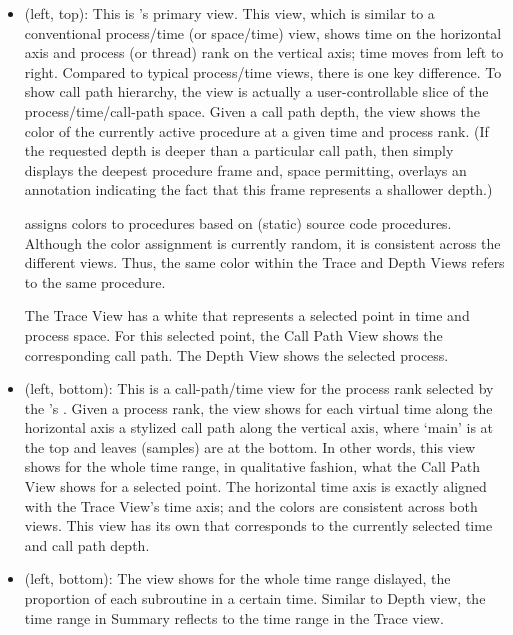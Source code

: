 \begin{itemize}
\item \textbf{\traceview} (left, top):
  This is \hpctraceviewer{}'s primary view.
  This view, which is similar to a conventional process/time (or space/time) view, shows time on the horizontal axis and process (or thread) rank on the vertical axis; time moves from left to right.
  Compared to typical process/time views, there is one key difference.
  To show call path hierarchy, the view is actually a user-controllable slice of the process/time/call-path space.
  Given a call path depth, the view shows the color of the currently active procedure at a given time and process rank.
  (If the requested depth is deeper than a particular call path, then \hpctraceviewer{} simply displays the deepest procedure frame and, space permitting, overlays an annotation indicating the fact that this frame represents a shallower depth.)

  \hpctraceviewer{} assigns colors to procedures based on (static) source code procedures.
  Although the color assignment is currently random, it is consistent across the different views.
  Thus, the same color within the Trace and Depth Views refers to the same procedure.

  The Trace View has a white \crosshair{} that represents a selected point in time and process space.
  For this selected point, the Call Path View shows the corresponding call path.
  The Depth View shows the selected process.

\item \textbf{\depthview} (left, bottom):
  This is a call-path/time view for the process rank selected by the \traceview's \crosshair{}.
  Given a process rank, the view shows for each virtual time along the horizontal axis a stylized call path along the vertical axis, where `main' is at the top and leaves (samples) are at the bottom.
  In other words, this view shows for the whole time range, in qualitative fashion, what the Call Path View shows for a selected point.
  The horizontal time axis is exactly aligned with the Trace View's time axis; and the colors are consistent across both views.
  This view has its own \crosshair{} that corresponds to the currently selected time and call path depth.

\item \textbf{\summaryview} (left, bottom):
  The view shows for the whole time range dislayed, the proportion of each subroutine in a certain time.
  Similar to Depth view, the time range in Summary reflects to the time range in the Trace view. 


\end{itemize}
